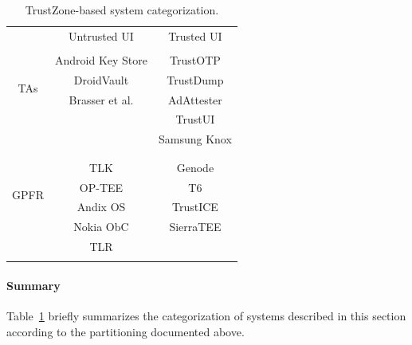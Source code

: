\begin{table}[t!]
	\centering
	\begin{tabular}{ c|c|c| }
		\multicolumn{1}{c}{} 	& \multicolumn{1}{c}{Untrusted UI} 	& \multicolumn{1}{c}{Trusted UI} \\ \cline{2-3}
		\multirow{5}{*}{TAs} 	&									& \\
								& Android Key Store					& TrustOTP \\
								& DroidVault 						& TrustDump \\
								& Brasser et al.					& AdAttester \\
								& 									& TrustUI \\
								&									& Samsung Knox\\
								&									& \\
								\cline{2-3}
		\multirow{5}{*}{GPFR}	&									& \\
								& TLK								& Genode \\
								& OP-TEE 							& T6 \\
								& Andix OS							& TrustICE \\
								& Nokia ObC							& SierraTEE \\
								& TLR 								& \\
								&									& \\
		\cline{2-3}
	\end{tabular}
	\caption{TrustZone-based system categorization.}
	\label{tab:trustzonesystemscomparison}
\end{table}

\paragraph{Summary} Table~\ref{tab:trustzonesystemscomparison} briefly summarizes the categorization of systems described in this section according to the partitioning documented above. %

